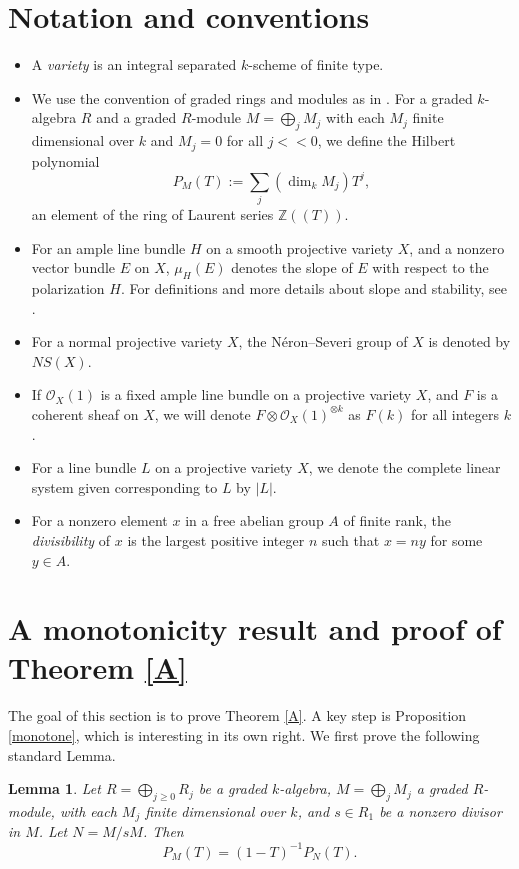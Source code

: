 \documentclass[11pt,letterpaper]{amsart}
\newtheorem{lemma}{Lemma}[section]
\begin{document}
\section{Notation and conventions}
\begin{itemize}
    \item A \textit{variety} is an integral separated $k$-scheme of finite type.
    \item We use the convention of graded rings and modules as in \cite[Section I.2]{hartshorne2013algebraic}. For a graded $k$-algebra $R$ and a graded $R$-module $M=\bigoplus_{j}M_j$ with each $M_j$ finite dimensional over $k$ and $M_j=0$ for all $j<<0$, we define the Hilbert polynomial
    $$P_M(T):=\sum_j(\dim_k M_j)T^j,$$ an element of the ring of Laurent series $\mathbb{Z}((T))$.
    \item For an ample line bundle $H$ on a smooth projective variety $X$, and a nonzero vector bundle $E$ on $X$, $\mu_H(E)$ denotes the slope of $E$ with respect to the polarization $H$. For definitions and more details about slope and stability, see \cite[Chapter 5]{kobayashi2014differential}.
    \item For a normal projective variety $X$, the
Néron--Severi group of $X$ is denoted by $NS(X).$ 
\item If $\mathcal{O}_X(1)$ is a fixed ample line bundle on a projective variety $X$, and $F$ is a coherent sheaf on $X$, we will denote $F\otimes \mathcal{O}_X(1)^{\otimes k}$ as $F(k)$ for all integers $k$.
\item For a line bundle $L$ on a projective variety $X$, we denote the complete linear system given corresponding to $L$ by $|L|$.
\item For a nonzero element $x$ in a free abelian group $A$ of finite rank, the \textit{divisibility} of $x$ is the largest positive integer $n$ such that $x=ny$ for some $y\in A$.
\end{itemize}
\section{A monotonicity result and proof of Theorem \ref{A}}
The goal of this section is to prove Theorem \ref{A}. A key step is Proposition \ref{monotone}, which is interesting in its own right. We first prove the following standard Lemma.
\begin{lemma}\label{Hilbert}
Let $R=\bigoplus_{j\ge0}R_j$ be a graded $k$-algebra, $M=\bigoplus_{j}M_j$ a graded $R$-module, with each $M_j$ finite dimensional over $k$, and
$s\in R_1$ be a nonzero divisor in $M$. Let $N=M/sM$. Then
\[
P_M(T)=(1-T)^{-1}P_N(T).
\]
\end{lemma}
\end{document}
